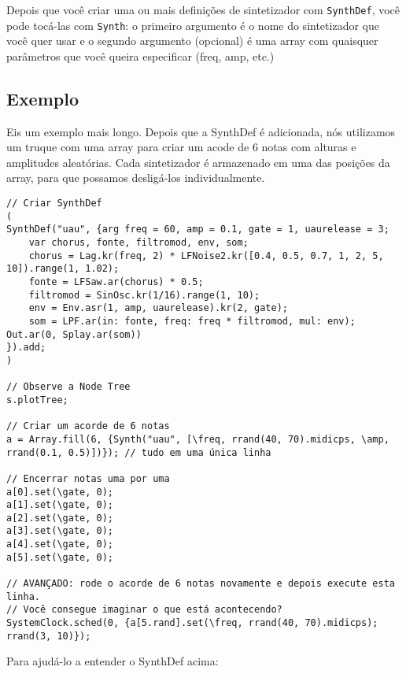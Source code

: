 Depois que você criar uma ou mais definições de sintetizador com \texttt{SynthDef}, você pode tocá-las com \texttt{Synth}: o primeiro argumento é o nome do sintetizador que você quer usar e o segundo argumento (opcional) é uma array com quaisquer parâmetros que você queira especificar (freq, amp, etc.)

\subsection{Exemplo}

Eis um exemplo mais longo. Depois que a SynthDef é adicionada, nós utilizamos um truque com uma array para criar um acode de 6 notas com alturas e amplitudes aleatórias. Cada sintetizador é armazenado em uma das posições da array, para que possamos desligá-los individualmente. 
 
\begin{lstlisting}[style=SuperCollider-IDE, basicstyle=\scttfamily\footnotesize]
// Criar SynthDef
(
SynthDef("uau", {arg freq = 60, amp = 0.1, gate = 1, uaurelease = 3;
	var chorus, fonte, filtromod, env, som;
	chorus = Lag.kr(freq, 2) * LFNoise2.kr([0.4, 0.5, 0.7, 1, 2, 5, 10]).range(1, 1.02);
	fonte = LFSaw.ar(chorus) * 0.5;
	filtromod = SinOsc.kr(1/16).range(1, 10);
	env = Env.asr(1, amp, uaurelease).kr(2, gate);
	som = LPF.ar(in: fonte, freq: freq * filtromod, mul: env);
Out.ar(0, Splay.ar(som))
}).add;
)

// Observe a Node Tree
s.plotTree;

// Criar um acorde de 6 notas
a = Array.fill(6, {Synth("uau", [\freq, rrand(40, 70).midicps, \amp, rrand(0.1, 0.5)])}); // tudo em uma única linha

// Encerrar notas uma por uma
a[0].set(\gate, 0);
a[1].set(\gate, 0);
a[2].set(\gate, 0);
a[3].set(\gate, 0);
a[4].set(\gate, 0);
a[5].set(\gate, 0);

// AVANÇADO: rode o acorde de 6 notas novamente e depois execute esta linha.
// Você consegue imaginar o que está acontecendo?
SystemClock.sched(0, {a[5.rand].set(\freq, rrand(40, 70).midicps); rrand(3, 10)});
\end{lstlisting}

Para ajudá-lo a entender o SynthDef acima:

